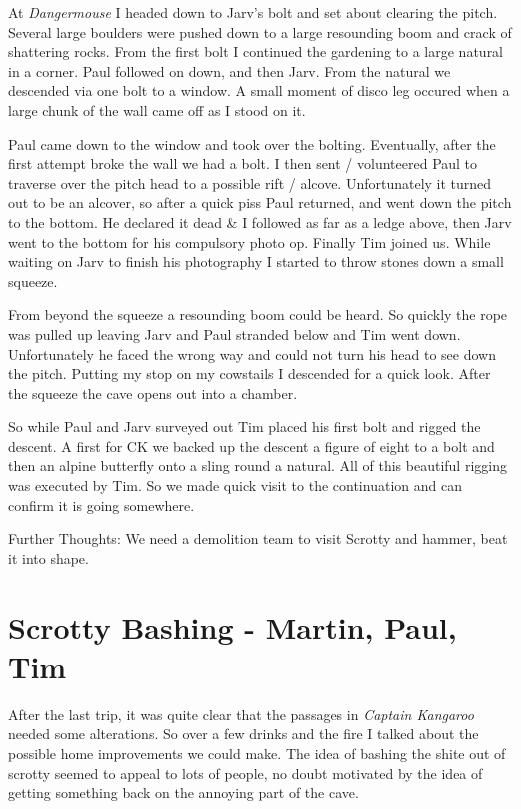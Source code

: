 At \emph{Dangermouse} I headed down to Jarv's bolt and set about
clearing the pitch. Several large boulders were pushed down to a large
resounding boom and crack of shattering rocks. From the first bolt I
continued the gardening to a large natural in a corner. Paul followed on
down, and then Jarv. From the natural we descended via one bolt to a
window. A small moment of disco leg occured when a large chunk of the
wall came off as I stood on it.

Paul came down to the window and took over the bolting. Eventually,
after the first attempt broke the wall we had a bolt. I then sent /
volunteered Paul to traverse over the pitch head to a possible rift /
alcove. Unfortunately it turned out to be an alcover, so after a quick
piss Paul returned, and went down the pitch to the bottom. He declared
it dead \& I followed as far as a ledge above, then Jarv went to the
bottom for his compulsory photo op. Finally Tim joined us. While waiting
on Jarv to finish his photography I started to throw stones down a small
squeeze.

From beyond the squeeze a resounding boom could be heard. So quickly the
rope was pulled up leaving Jarv and Paul stranded below and Tim went
down. Unfortunately he faced the wrong way and could not turn his head
to see down the pitch. Putting my stop on my cowstails I descended for a
quick look. After the squeeze the cave opens out into a chamber.

So while Paul and Jarv surveyed out Tim placed his first bolt and rigged
the descent. A first for CK we backed up the descent a figure of eight
to a bolt and then an alpine butterfly onto a sling round a natural. All
of this beautiful rigging was executed by Tim. So we made quick visit to
the continuation and can confirm it is going somewhere.

Further Thoughts: We need a demolition team to visit Scrotty and hammer,
beat it into shape.


\hypertarget{scrotty-bashing---martin-paul-tim}{%
\section{Scrotty Bashing - Martin, Paul,
Tim}\label{scrotty-bashing---martin-paul-tim}}

After the last trip, it was quite clear that the passages in
\emph{Captain Kangaroo} needed some alterations. So over a few drinks
and the fire I talked about the possible home improvements we could
make. The idea of bashing the shite out of scrotty seemed to appeal to
lots of people, no doubt motivated by the idea of getting something back
on the annoying part of the cave.

